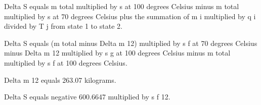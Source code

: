Delta S equals m total multiplied by s at 100 degrees Celsius minus m total multiplied by s at 70 degrees Celsius plus the summation of m i multiplied by q i divided by T j from state 1 to state 2.  

Delta S equals (m total minus Delta m 12) multiplied by s f at 70 degrees Celsius minus Delta m 12 multiplied by s g at 100 degrees Celsius minus m total multiplied by s f at 100 degrees Celsius.  

Delta m 12 equals 263.07 kilograms.  

Delta S equals negative 600.6647 multiplied by s f 12.